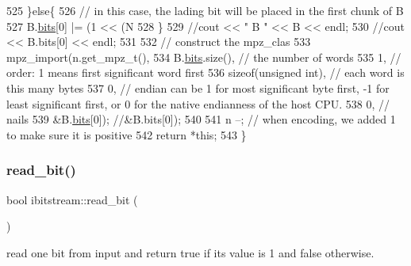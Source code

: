 \begin{DoxyCode}
525   \}\textcolor{keywordflow}{else}\{
526     \textcolor{comment}{// in this case, the lading bit will be placed in the first chunk of B}
527     B.\hyperlink{classbit__pipe_a86f38af1e9736b053728033490476b50}{bits}[0] |= (1 << (N %
528   \}
529   \textcolor{comment}{//cout << " B " << B << endl;}
530   \textcolor{comment}{//cout << B.bits[0] << endl;}
531 
532   \textcolor{comment}{// construct the mpz\_clas}
533   mpz\_import(n.get\_mpz\_t(),
534              B.\hyperlink{classbit__pipe_a86f38af1e9736b053728033490476b50}{bits}.size(), \textcolor{comment}{// the number of words}
535              1, \textcolor{comment}{// order: 1 means first significant word first}
536              \textcolor{keyword}{sizeof}(\textcolor{keywordtype}{unsigned} int), \textcolor{comment}{// each word is this many bytes}
537              0, \textcolor{comment}{// endian can be 1 for most significant byte first, -1 for least significant first, or 0
       for the native endianness of the host CPU.}
538              0, \textcolor{comment}{// nails}
539              &B.\hyperlink{classbit__pipe_a86f38af1e9736b053728033490476b50}{bits}[0]); \textcolor{comment}{//&B.bits[0]);}
540 
541   n --; \textcolor{comment}{// when encoding, we added 1 to make sure it is positive}
542   \textcolor{keywordflow}{return} *\textcolor{keyword}{this};
543 \}
\end{DoxyCode}
\mbox{\label{classibitstream_a895239acf7179f6778388c39c97643e4}} 
\subsubsection{\texorpdfstring{read\+\_\+bit()}{read\_bit()}}
{\footnotesize\ttfamily bool ibitstream\+::read\+\_\+bit (\begin{DoxyParamCaption}{ }\end{DoxyParamCaption})}



read one bit from input and return true if its value is 1 and false otherwise. 


